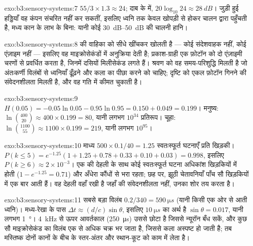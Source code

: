 \begin{solution}{exo:b3:sensory-systems:7}
$55/3\times 1.3 \approx 24$; दाब के  में, $20\log_{10}24
\approx \qty{28}{dB}$। जुड़ी हुई हड्डियाँ वह कंपन संचरित नहीं कर
सकतीं, इसलिए ध्वनि  तक केवल खोपड़ी से होकर चालन द्वारा
पहुँचती है, मध्य कान के लाभ के बिना: यानी कोई
\qtyrange{30}{50}{dB} की चालनी हानि।
\end{solution}

\begin{solution}{exo:b3:sensory-systems:8}
 की वाहिका को  सीधे खींचकर खोलती है --- कोई
संदेशवाहक नहीं, कोई एंज़ाइम नहीं --- इसलिए वह माइक्रोसेकंडों में
अनुक्रिया देती है; प्रकाश-ग्राही एक फ़ोटॉन को दो एंज़ाइमी चरणों से
प्रवर्धित करता है, जिनमें दसियों मिलीसेकंड लगते हैं। श्रवण को वह
समय-परिशुद्धि मिलती है जो अंतःकर्णी विलंबों से ध्वनियाँ ढूँढ़ने और कला
का पीछा करने को चाहिए; दृष्टि को एकल फ़ोटॉन गिनने की संवेदनशीलता मिलती
है, और वह गति में कीमत चुकाती है।
\end{solution}

\begin{solution}{exo:b3:sensory-systems:9}
$H(0.05) = -0.05\ln 0.05 - 0.95\ln 0.95 = 0.150 + 0.049 = 0.199$।
मनुष्य: $\ln\binom{400}{20} \approx 400\times 0.199 = 80$, यानी लगभग
$10^{34}$ प्रतिरूप। चूहा: $\ln\binom{1100}{55} \approx 1100\times 0.199
= 219$, यानी लगभग $10^{95}$।
\end{solution}

\begin{solution}{exo:b3:sensory-systems:10}
माध्य $500\times 0.1/40 = 1.25$ स्वतःस्फूर्त घटनाएँ प्रति खिड़की। $P(k
\le 5) = e^{-1.25}(1 + 1.25 + 0.78 + 0.33 + 0.10 + 0.03) = 0.998$,
इसलिए $P(k \ge 6) \approx 2\times 10^{-3}$। एक की देहली के साथ कोई
स्वतःस्फूर्त घटना अधिकांश खिड़कियों में होती ($1 - e^{-1.25} = 0.71$)
और अँधेरा कौंधों से भरा रहता; छह पर, झूठी चेतावनियाँ पाँच सौ खिड़कियों
में एक बार आती हैं। वह देहली वहाँ रखी है जहाँ  की संवेदनशीलता
नहीं, उनका शोर तय करता है।
\end{solution}

\begin{solution}{exo:b3:sensory-systems:11}
सबसे बड़ा विलंब $0.2/340 = \qty{590}{\micro s}$ (यानी किसी एक ओर से
आती ध्वनि)। मध्य-रेखा के पास $\Delta t \approx (d/c)\sin\theta$,
इसलिए $\qty{10}{\micro
s}$ का अर्थ है $\sin\theta = 0.017$, यानी लगभग \qty{1}{\degree}।
\qty{4}{kHz} से ऊपर आवर्तकाल (\qty{250}{\micro s}) उससे छोटा है जिससे
न्यूरॉन बँध सकें, और कुछ सौ माइक्रोसेकंड का विलंब एक से अधिक चक्र भर
जाता है, जिससे कला अस्पष्ट हो जाती है; तब मस्तिष्क दोनों कानों के बीच
के स्तर-अंतर और स्थान-कूट को काम में लेता है।
\end{solution}

